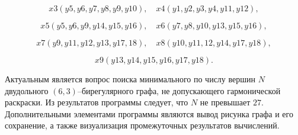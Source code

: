  $$x3(y5,y6,y7,y8,y9,y10), \quad x4(y1,y2,y3,y4,y11,y12),$$

 $$x5(y5,y6,y9,y14,y15,y16), \quad x6(y7,y8,y10,y13,y15,y16),$$

 $$x7(y9,y11,y12,y13,y17, 18), \quad x8(y10,y11, 12,y14,y17,y18),$$

 $$x9(y13, y14, y15, y16, y17, y18).$$

Актуальным является вопрос поиска минимального по числу вершин $N$ двудольного $(6,3)$--бирегулярного графа, не допускающего гармонической раскраски. Из результатов программы следует, что $N$ не превышает $27$. Дополнительными элементами программы являются вывод рисунка графа и его сохранение, а также визуализация промежуточных результатов вычислений.

